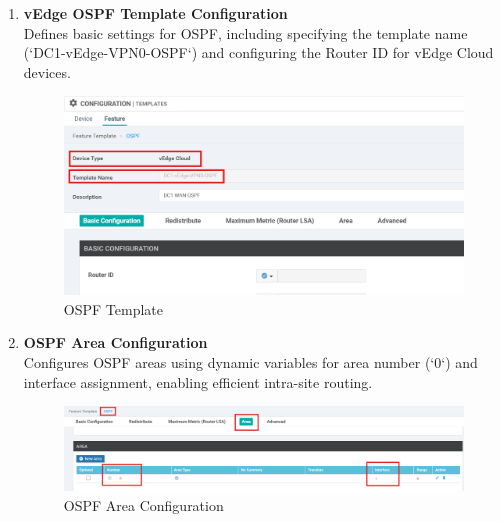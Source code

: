 \documentclass[12pt,english]{report}
\begin{document}
\begin{enumerate}
    \item \textbf{vEdge OSPF Template Configuration} \\
    Defines basic settings for OSPF, including specifying the template name (`DC1-vEdge-VPN0-OSPF`) and configuring the Router ID for vEdge Cloud devices.
\begin{figure}[H]
    \centering
    \includegraphics[width= 0.8 \textwidth]{chapitre 3/template/4.png}
    \caption{OSPF Template}
    \label{OSPF Template}
\end{figure}
    \item \textbf{OSPF Area Configuration} \\
    Configures OSPF areas using dynamic variables for area number (`0`) and interface assignment, enabling efficient intra-site routing.
\begin{figure}[H]
    \centering
    \includegraphics[width= 1 \textwidth]{chapitre 3/template/4.5.png}
    \caption{OSPF Area Configuration}
    \label{OSPF Area Configuration}
\end{figure}
\end{enumerate}
\end{document}
